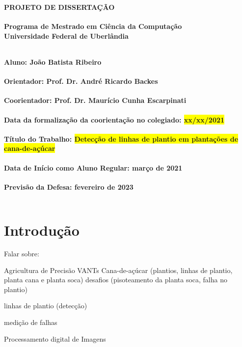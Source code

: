 \documentclass[12pt, a4paper, english, brazil]{article}
\newcommand{\ideia}[1]{\todo[author=\textbf{Ideia},color=green!30,caption={#1},inline]{#1}}
\newcommand{\duvida}[1]{\todo[author=\textbf{Dúvida},color=cyan!30,caption={#1},inline]{#1}}
\newcommand{\revisar}[1]{\todo[author=\textbf{Revisar},color=yellow!30,caption={#1},inline]{#1}}
\newcommand{\atencao}[1]{\todo[author=\textbf{Atenção},color=red!30,caption={#1},inline]{#1}}
\newcommand{\lineS}[1]{
    {{\color{black} 
        \noindent\makebox[\linewidth]{\rule{\paperwidth}{1pt}}
        }}
    {{\color{red} #1 }}

    {{\color{black}
        \noindent\makebox[\linewidth]{\rule{\paperwidth}{1pt}}
    }}
}
\newcommand{\textBlue}[1]{{{\color{blue} #1}}}
\begin{document}
\rhead{\thepage}

\begin{center}
	\bf{\LARGE{PROJETO DE DISSERTAÇÃO}\\ $\ $\\}
	\Large{Programa de Mestrado em Ciência da Computação\\
		Universidade Federal de Uberlândia}\\ $\ $\\
\end{center}

\begin{center}
	\bf{Aluno: João Batista Ribeiro\\ $\ $\\
		Orientador: Prof. Dr. André Ricardo Backes\\ $\ $\\
		Coorientador: Prof. Dr. Maurício Cunha Escarpinati\\ $\ $\\
		Data da formalização da coorientação no colegiado: \colorbox{yellow}{xx/xx/2021}\\ $\ $\\
		Título do Trabalho: \colorbox{yellow}{Detecção de linhas de plantio em plantações de cana-de-açúcar}\\ $\ $\\
		Data de Início como Aluno Regular: março de 2021\\ $\ $\\
		Previsão da Defesa: fevereiro de 2023\\ $\ $\\}
\end{center}

\section{Introdução}





\textBlue{
Falar sobre:

Agricultura de Precisão
    VANTs
Cana-de-açúcar (plantios, linhas de plantio, planta cana e planta soca)
desafios (pisoteamento da planta soca, falha no plantio)

linhas de plantio (detecção) 

medição de falhas

Processamento digital de Imagens
}
\end{document}

